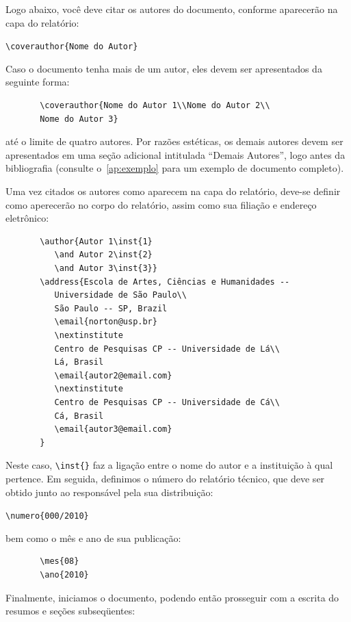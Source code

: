 \documentclass[12pt,a4paper,utf8]{ppgsi}
\begin{document}
	Logo abaixo, você deve citar os autores do documento, conforme aparecerão na capa do relatório:

	\verb|\coverauthor{Nome do Autor}|

	Caso o documento tenha mais de um autor, eles devem ser apresentados da seguinte forma:

	\begin{verbatim}
	   \coverauthor{Nome do Autor 1\\Nome do Autor 2\\
	   Nome do Autor 3}
	\end{verbatim}


	\noindent até o limite de quatro autores. Por razões estéticas, os demais autores devem ser apresentados em uma seção adicional intitulada ``Demais Autores'', logo antes da bibliografia (consulte o~\ref{ap:exemplo} para um exemplo de documento completo).

	Uma vez citados os autores como aparecem na capa do relatório, deve-se definir como aperecerão no corpo do relatório, assim como sua filiação e endereço eletrônico:

	\begin{verbatim}
	   \author{Autor 1\inst{1}
	      \and Autor 2\inst{2}
	      \and Autor 3\inst{3}}
	   \address{Escola de Artes, Ciências e Humanidades --
	      Universidade de São Paulo\\
	      São Paulo -- SP, Brazil
	      \email{norton@usp.br}
	      \nextinstitute
	      Centro de Pesquisas CP -- Universidade de Lá\\
	      Lá, Brasil
	      \email{autor2@email.com}
	      \nextinstitute
	      Centro de Pesquisas CP -- Universidade de Cá\\
	      Cá, Brasil
	      \email{autor3@email.com}
	   }
	\end{verbatim}

	Neste caso, \verb|\inst{}| faz a ligação entre o nome do autor e a instituição à qual pertence. Em seguida, definimos o número do relatório técnico, que deve ser obtido junto ao responsável pela sua distribuição:

	\verb|\numero{000/2010}|

	\noindent bem como o mês e ano de sua publicação:

	\begin{verbatim}
	   \mes{08}
	   \ano{2010}
	\end{verbatim}

	Finalmente, iniciamos o documento, podendo então prosseguir com a escrita do resumos e seções subseqüentes:
\end{document}
